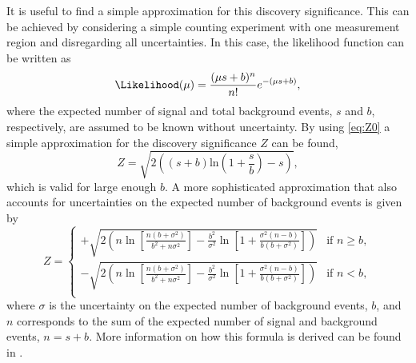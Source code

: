 It is useful to find a simple approximation for this discovery significance. 
This can be achieved by considering a simple counting experiment with one measurement region and disregarding all uncertainties. In this case, the likelihood function can be written as
\begin{equation}
  \Likelihood(\mu) = \frac{(\mu s +b)^n}{n!} e^{-(\mu s+b)},
\end{equation}
where the expected number of signal and total background events, $s$ and $b$, respectively, are assumed to be known without uncertainty.
By using \cref{eq:Z0} a simple approximation for the discovery significance $Z$ can be found,
\begin{equation}
    \label{eq:discovery-significance}
  Z = \sqrt{2 \left( \left(s + b\right) \text{ln}\left(1 + \frac{s}{b}\right) - s\right)},
\end{equation}
which is valid for large enough $b$.
A more sophisticated approximation that also accounts for uncertainties on the expected number of background events is given by
\begin{equation}
    \label{eq:simple-sign}
    Z = 
    \begin{cases}
    + \sqrt{ 2 \left( n \ln \left[ \frac{n \left( b + \sigma^2 \right)}{b^2 + n \sigma^2} \right] - \frac{b^2}{\sigma^2} \ln \left[ 1 + \frac{\sigma^2 \left(n - b \right) }{b \left( b + \sigma ^2 \right) } \right] \right)   } & \text{if } n \geq b, \\
    - \sqrt{ 2 \left( n \ln \left[ \frac{n \left( b + \sigma^2 \right)}{b^2 + n \sigma^2} \right] - \frac{b^2}{\sigma^2} \ln \left[ 1 + \frac{\sigma^2 \left(n - b \right) }{b \left( b + \sigma ^2 \right) } \right] \right)   } & \text{if } n < b, \\
\end{cases}
\end{equation}
where $\sigma$ is the uncertainty on the expected number of background events, $b$, and $n$ corresponds to the sum of the expected number of signal and background events, $n = s+b$.
More information on how this formula is derived can be found in .





